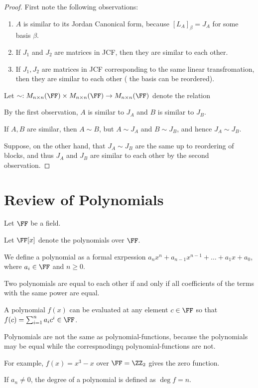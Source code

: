 \documentclass[11pt]{scrartcl}
\begin{document}
\begin{proof}
  \hfill

First note the following observations:
\begin{enumerate}
\item  $A$ is similar to its Jordan Canonical form, because $[L_A]_{\beta} = J_A$ for some basis $\beta$.
\item If $J_1$ and $J_2$ are matrices in JCF, then they are similar to each other.
\item If $J_1, J_2$ are matrices in JCF corresponding to the same
  linear transfromation, then they are similar to each other ( the basis can be reordered).
\end{enumerate}

Let $\sim:M_{n\times n}(\FF)\times M_{n\times n}(\FF)\to M_{n\times n}(\FF)$ denote the relation 

By the first observation, $A$ is similar to $J_A$ and $B$ is similar to $J_{B}$.

If $A, B$ are similar, then $A\sim B$, but $A\sim J_A$ and $B\sim J_{B}$, and hence $J_A\sim J_{B}$.

Suppose, on the other hand, that $J_A\sim J_{B}$ are the same up to
reordering of blocks, and thus $J_A$ and $J_{B}$ are similar to each other by the second observation.
\end{proof}

\section{Review of Polynomials}

Let $\FF$ be a field.

Let $\FF[x]$ denote the polynomials over $\FF$.

We define a polynomial as a formal exrpession
$a_nx^n+a_{n-1}x^{n-1}+\dots+a_1x+a_{0}$, where $a_i\in \FF$ and
$n \geq 0$.

Two polynomials are equal to each other if and only if all
coefficients of the terms with the same power are equal.

A polynomial $f(x)$ can be evaluated at any element $c\in\FF$ so that
$f(c) = \sum_{i=1}^na_ic^i \in \FF$.

Polynomials are not the same as polynomial-functions, because the
polynomials may be equal while the correspnodingq polynomial-functions
are not.

For example, $f(x) = x^3-x$ over $\FF = \ZZ_2$ gives the zero function.

\begin{definition}
If $a_n\neq 0$, the degree of a polynomial is defined as $\deg f = n$.
\end{definition}
\end{document}
